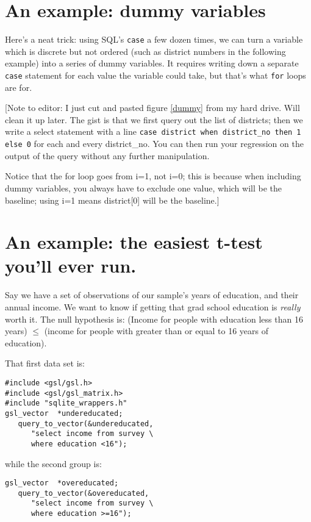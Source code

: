 \section{An example: dummy variables}
Here's a neat trick: using SQL's {\tt case} a few dozen times, we can turn a
variable which is discrete but not ordered (such as district numbers in the
following example) into a series of dummy variables. It requires writing down a
separate {\tt case} statement for each value the variable could take, but that's
what {\tt for} loops are for.


[Note to editor: I just cut and pasted figure \ref{dummy} from my hard drive. Will clean it up
later. The gist is that we first query out the list of districts; then we write a
select statement with a line {\tt case district when district\_no then 1 else 0} for
each and every district\_no. You can then run your regression on the output of the
query without any further manipulation.

Notice that the for loop goes from i=1, not i=0; this is because when including
dummy variables, you always have to exclude one value, which will be the baseline;
using i=1 means district[0] will be the baseline.]




\section{An example: the easiest t-test you'll ever run.}
Say we have a set of observations of our sample's years of education, and their annual income. We want to
know if getting that grad school education is {\it really} worth it. The null hypothesis is: (Income for
people with education less than 16 years) $\leq$ (income for people with greater than or equal to 16 years
of education).

That first data set is:
\begin{verbatim}
#include <gsl/gsl.h>
#include <gsl/gsl_matrix.h>
#include "sqlite_wrappers.h"
gsl_vector	*undereducated;
   query_to_vector(&undereducated, 
      "select income from survey \
      where education <16");
\end{verbatim}
while the second group is:
\begin{verbatim}
gsl_vector	*overeducated;
   query_to_vector(&overeducated, 
      "select income from survey \
      where education >=16");
\end{verbatim}

